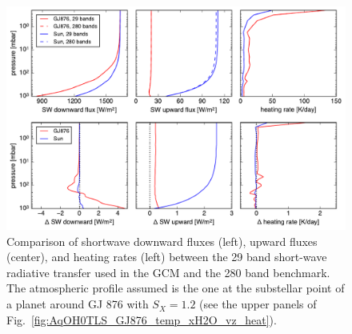 \documentclass[11pt,numberedappendix,twocolappendix,]{emulateapj}
\begin{document}
\begin{figure}[!htb]
    \begin{center}
    \includegraphics[width=0.8\hsize]{rad_comparison_SW29-SW280_AqOH0TLS_GJ876S12P20L40Q.pdf}
    \end{center}
\caption{Comparison of shortwave downward fluxes (left), upward fluxes (center), and heating rates (left) between the 29 band short-wave radiative transfer used in the GCM and the 280 band benchmark. The atmospheric profile assumed is the one at the substellar point of a planet around GJ 876 with $S_X=1.2$ (see the upper panels of Fig.~\ref{fig:AqOH0TLS_GJ876_temp_xH2O_vz_heat}). }
\label{fig:socrates}
\end{figure}
\end{document}
